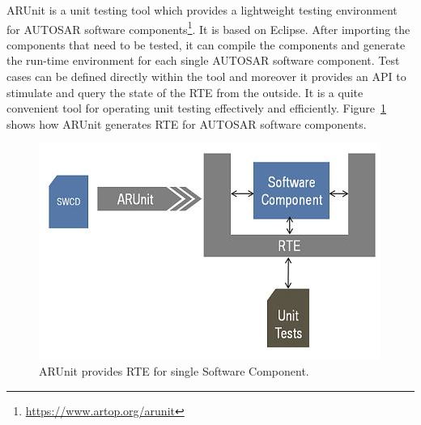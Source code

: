 ARUnit is a unit testing tool which provides a lightweight testing environment for AUTOSAR software components\footnote{\url{https://www.artop.org/arunit}}. It is based on Eclipse. After importing the components that need to be tested, it can compile the components and generate the run-time environment for each single AUTOSAR software component. %
Test cases can be defined directly within the tool and moreover it provides an API to stimulate and query the state of the RTE from the outside. 
It is a quite convenient tool for operating unit testing effectively and efficiently. Figure~\ref{fig:ARUnit} shows how ARUnit generates RTE for AUTOSAR software components. %

\begin{figure}[htb]
\centering
\includegraphics[width=0.9\linewidth]{figure/arunitin.jpg}
\caption{ARUnit provides RTE for single Software Component.}
\label{fig:ARUnit}
\end{figure}